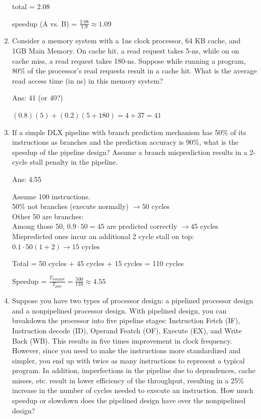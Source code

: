 \documentclass[12pt]{article}
\begin{document}
\begin{enumerate}
        total = 2.08

        speedup (A vs. B) = $\frac{2.08}{1.9} \approx 1.09$

        \item Consider a memory system with a 1ns clock processor, 64 KB cache, and 1GB Main Memory. On cache hit, a 
        read request takes 5-ns, while on on cache miss, a read request takes 180-ns. Suppose while running a program, 
        80\% of the processor’s read requests result in a cache hit. What is the average read access time (in ns) in 
        this memory system?

        Ans: 41 (or 40?)

        $(0.8)(5) + (0.2)(5 + 180) = 4 + 37 = 41$

        \item If a simple DLX pipeline with branch prediction mechanism has 50\% of its instructions as branches and 
        the prediction accuracy is 90\%, what is the speedup of the pipeline design? Assume a branch misprediction 
        results in a 2-cycle stall penalty in the pipeline.

        Ans: 4.55

        Assume 100 instructions.\\
        50\% not branches (execute normally) $\longrightarrow 50$ cycles\\
        Other 50 are branches:\\
        Among those 50, $0.9 \cdot 50 = 45$ are predicted correctly $\longrightarrow 45$ cycles\\
        Mispredicted ones incur an additional 2 cycle stall on top: $0.1 \cdot 50 (1 + 2) \longrightarrow 15$ cycles

        Total = 50 cycles + 45 cycles + 15 cycles = 110 cycles

        Speedup = $\frac{T_{nonpipe}}{T_{pipe}} = \frac{500}{110} \approx 4.55$

        \item Suppose you have two types of processor design: a pipelined processor design and a non­pipelined processor 
        design. With pipelined design, you can breakdown the processor into five pipeline stages: Instruction Fetch (IF), 
        Instruction decode (ID), Operand Featch (OF), Execute (EX), and Write Back (WB). This results in five times 
        improvement in clock frequency. However, since you need to make the instructions more standardized and simpler, 
        you end up with twice as many instructions to represent a typical program. In addition, imperfections in the 
        pipeline due to dependences, cache misses, etc. result in lower efficiency of the throughput, resulting in a 
        25\% increase in the number of cycles needed to execute an instruction. How much speedup or slowdown does the 
        pipelined design have over the non­pipelined design?


\end{enumerate}
\end{document}
